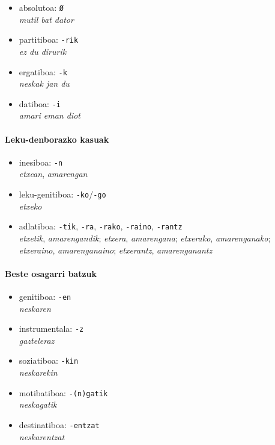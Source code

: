 \documentclass[
]{book}
\providecommand{\tightlist}{%
  \setlength{\itemsep}{0pt}\setlength{\parskip}{0pt}}
\begin{document}
\begin{itemize}
\tightlist
\item
  absolutoa: \texttt{Ø}\\
  \emph{mutil bat dator}
\item
  partitiboa: \texttt{-rik}\\
  \emph{ez du dirurik}
\item
  ergatiboa: \texttt{-k}\\
  \emph{neskak jan du}
\item
  datiboa: \texttt{-i}\\
  \emph{amari eman diot}
\end{itemize}

\hypertarget{leku-denborazko-kasuak}{%
\paragraph{Leku-denborazko kasuak}\label{leku-denborazko-kasuak}}

\begin{itemize}
\tightlist
\item
  inesiboa: \texttt{-n}\\
  \emph{etxean}, \emph{amarengan}
\item
  leku-genitiboa: \texttt{-ko}/\texttt{-go}\\
  \emph{etxeko}
\item
  adlatiboa: \texttt{-tik}, \texttt{-ra}, \texttt{-rako}, \texttt{-raino}, \texttt{-rantz}\\
  \emph{etxetik}, \emph{amarengandik}; \emph{etxera}, \emph{amarengana}; \emph{etxerako}, \emph{amarenganako}; \emph{etxeraino}, \emph{amarenganaino}; \emph{etxerantz}, \emph{amarenganantz}
\end{itemize}

\hypertarget{beste-osagarri-batzuk}{%
\paragraph{Beste osagarri batzuk}\label{beste-osagarri-batzuk}}

\begin{itemize}
\tightlist
\item
  genitiboa: \texttt{-en}\\
  \emph{neskaren}
\item
  instrumentala: \texttt{-z}\\
  \emph{gazteleraz}
\item
  soziatiboa: \texttt{-kin}\\
  \emph{neskarekin}
\item
  motibatiboa: \texttt{-(n)gatik}\\
  \emph{neskagatik}
\item
  destinatiboa: \texttt{-entzat}\\
  \emph{neskarentzat}
\end{itemize}
\end{document}
